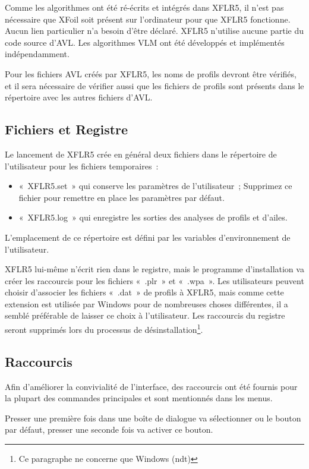 \documentclass[a4paper,twoside,12pt,dvips]{article}
\begin{document}
Comme les algorithmes ont été ré-écrits et intégrés dans XFLR5, il n’est
pas nécessaire que XFoil soit présent sur l’ordinateur pour que XFLR5
fonctionne. Aucun lien particulier n’a besoin d’être déclaré. XFLR5 n’utilise
aucune partie du code source d’AVL. Les algorithmes VLM ont été développés
et implémentés indépendamment.

Pour les fichiers AVL créés par XFLR5, les noms de profils devront être 
vérifiés, et il sera nécessaire de vérifier aussi que les fichiers de profils 
sont présents dans le répertoire avec les autres fichiers d’AVL. 

\subsection{Fichiers et Registre}

Le lancement de XFLR5 crée en général deux fichiers dans le répertoire de
l’utilisateur pour les fichiers temporaires~:

\begin{itemize}
	\item «~XFLR5.set~» qui conserve les paramètres de l’utilisateur~;
	Supprimez ce fichier pour remettre en place les paramètres par défaut.
	\item «~XFLR5.log~» qui enregistre les sorties des analyses de profils et 
	d’ailes.
\end{itemize}

L’emplacement de ce répertoire est défini par les variables d’environnement de l’utilisateur.

XFLR5 lui-même n’écrit rien dans le registre, mais le programme d’installation va créer les raccourcis pour les fichiers «~.plr~» et «~.wpa~». Les utilisateurs peuvent choisir d’associer les fichiers «~.dat~» de profils à XFLR5, mais comme cette extension est utilisée par Windows pour de nombreuses choses différentes, il a semblé préférable de laisser ce choix à l’utilisateur. Les raccourcis du registre seront supprimés lors du processus de désinstallation\footnote{Ce paragraphe ne concerne que Windows (ndt)}.

\subsection{Raccourcis}

Afin d’améliorer la convivialité de l’interface, des raccourcis ont été fournis pour la plupart des commandes principales et sont mentionnés dans les menus.

Presser une première fois  dans une boîte de dialogue va sélectionner  ou le bouton par défaut, presser une seconde fois 
 va activer ce bouton.
\end{document}
